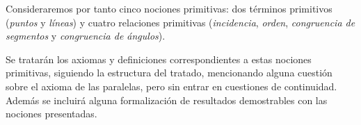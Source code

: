 Consideraremos por tanto cinco nociones primitivas: dos términos primitivos
(\textit{puntos} y \textit{líneas}) y cuatro relaciones primitivas
(\textit{incidencia}, \textit{orden}, \textit{congruencia de segmentos} y
\textit{congruencia de ángulos}).


Se tratarán los axiomas y definiciones correspondientes a estas nociones
primitivas, siguiendo la estructura del tratado, mencionando alguna cuestión
sobre el axioma de las paralelas, pero sin entrar en cuestiones de continuidad.
Además se incluirá alguna formalización de resultados demostrables con las
nociones presentadas.


